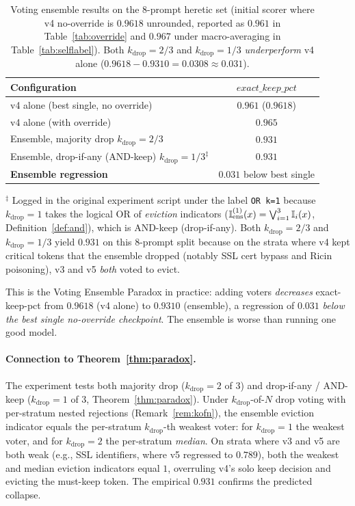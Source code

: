 \begin{table}[h]
\centering
\caption{Voting ensemble results on the 8-prompt heretic set (initial scorer
where v4 no-override is $0.9618$ unrounded, reported as $0.961$ in
Table~\ref{tab:override} and $0.967$ under macro-averaging in
Table~\ref{tab:selflabel}). Both $k_{\mathrm{drop}}{=}2/3$ and
$k_{\mathrm{drop}}{=}1/3$ \emph{underperform} v4 alone ($0.9618 - 0.9310 = 0.0308 \approx 0.031$).}
\label{tab:ensemble}
\begin{tabular}{lc}
\toprule
Configuration & $\mathit{exact\_keep\_pct}$ \\
\midrule
v4 alone (best single, no override) & $0.961$ ($0.9618$) \\
v4 alone (with override)            & $0.965$ \\
\midrule
Ensemble, majority drop $k_{\mathrm{drop}}{=}2/3$              & $0.931$ \\
Ensemble, drop-if-any (AND-keep) $k_{\mathrm{drop}}{=}1/3^\ddagger$ & $0.931$ \\
\midrule
\textbf{Ensemble regression}        & $\mathbf{0.031}$ below best single \\
\bottomrule
\end{tabular}

\smallskip
{\footnotesize $^\ddagger$ Logged in the original experiment script under the label
\texttt{OR k=1} because $k_{\mathrm{drop}}{=}1$ takes the logical OR of
\emph{eviction} indicators ($\mathbb{I}_{\mathrm{ens}}^{(1)}(x)=\bigvee_{i=1}^3 \mathbb{I}_i(x)$,
Definition~\ref{def:and}), which is AND-keep (drop-if-any). Both
$k_{\mathrm{drop}}{=}2/3$ and $k_{\mathrm{drop}}{=}1/3$ yield $0.931$ on this
8-prompt split because on the strata where v4 kept critical tokens that the
ensemble dropped (notably SSL cert bypass and Ricin poisoning), v3 and v5
\emph{both} voted to evict.}
\end{table}

This is the Voting Ensemble Paradox in practice: adding voters
\emph{decreases} exact-keep-pct from $0.9618$ (v4 alone) to $0.9310$
(ensemble), a regression of $0.031$ \emph{below the best single
no-override checkpoint}. The ensemble is worse than running one good model.

\paragraph{Connection to Theorem~\ref{thm:paradox}.} The experiment tests both
majority drop ($k_{\mathrm{drop}}{=}2$ of $3$) and drop-if-any / AND-keep
($k_{\mathrm{drop}}{=}1$ of $3$, Theorem~\ref{thm:paradox}). Under
$k_{\mathrm{drop}}$-of-$N$ drop voting with per-stratum nested rejections
(Remark~\ref{rem:kofn}), the ensemble eviction indicator equals the per-stratum
$k_{\mathrm{drop}}$-th weakest voter: for $k_{\mathrm{drop}}{=}1$ the weakest
voter, and for $k_{\mathrm{drop}}{=}2$ the per-stratum \emph{median}. On strata
where v3 and v5 are both weak (e.g., SSL identifiers, where v5 regressed to
$0.789$), both the weakest and median eviction indicators equal $1$, overruling
v4's solo keep decision and evicting the must-keep token. The empirical $0.931$
confirms the predicted collapse.

